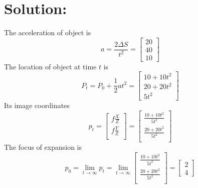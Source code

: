 \documentclass[12pt]{article}
\begin{document}
\section{Solution:}
The acceleration of object is 
\begin{equation*}
    a = \frac{2\Delta S}{t^2} = \left[ \begin{array}{c}
20\\
40\\
10
\end{array} \right]
\end{equation*}
The location of object at time $t$ is 
\begin{equation*}
P_t = P_0 + \frac{1}{2}at^2 = \left[ \begin{array}{c}
10 +10t^2\\
20 + 20t^2\\
5t^2
\end{array} \right]
\end{equation*}
Its image coordinates
\begin{equation*}
p_t = \left[ \begin{array}{c}
f\frac{X}{Z}\\
f\frac{Y}{Z}\\
\end{array} \right]=\left[ \begin{array}{c}
\frac{10 +10t^2}{5t^2}\\
\frac{20 + 20t^2}{5t^2}\\
\end{array} \right]
\end{equation*}
The focus of expansion is
\begin{equation*}
p_0= \lim\limits_{t\to\infty}p_t = \lim\limits_{t\to\infty}\left[ \begin{array}{c}
\frac{10 +10t^2}{5t^2}\\
\frac{20 + 20t^2}{5t^2}\\
\end{array} \right] = \left[ \begin{array}{c}
2\\
4
\end{array} \right ]
\end{equation*}
\end{document}
